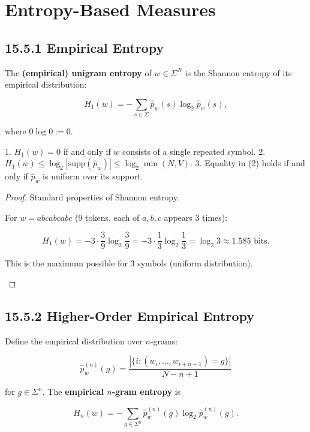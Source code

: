 \section{Entropy-Based Measures}

\subsection{15.5.1 Empirical Entropy}

\begin{definition}
The \textbf{(empirical) unigram entropy} of $w \in \Sigma^N$ is the Shannon entropy of its empirical distribution:

\[H_1(w) = -\sum_{s \in \Sigma} \hat{p}_w(s) \log_2 \hat{p}_w(s),\]

where $0 \log 0 := 0$.
\end{definition}

\begin{proposition}
1. $H_1(w) = 0$ if and only if $w$ consists of a single repeated symbol.
2. $H_1(w) \leq \log_2 |\mathrm{supp}(\hat{p}_w)| \leq \log_2 \min(N, V)$.
3. Equality in (2) holds if and only if $\hat{p}_w$ is uniform over its support.


\end{proposition}

\begin{proof}
Standard properties of Shannon entropy. 

\begin{example}
For $w = abcabcabc$ (9 tokens, each of $a, b, c$ appears 3 times):

\[H_1(w) = -3 \cdot \frac{3}{9} \log_2 \frac{3}{9} = -3 \cdot \frac{1}{3} \log_2 \frac{1}{3} = \log_2 3 \approx 1.585 \text{ bits}.\]

This is the maximum possible for 3 symbols (uniform distribution).
\end{example}

\end{proof}

\subsection{15.5.2 Higher-Order Empirical Entropy}

\begin{definition}
Define the empirical distribution over $n$-grams:

\[\hat{p}_w^{(n)}(g) = \frac{|\{i : (w_i, \ldots, w_{i+n-1}) = g\}|}{N - n + 1}\]

for $g \in \Sigma^n$. The \textbf{empirical $n$-gram entropy} is

\[H_n(w) = -\sum_{g \in \Sigma^n} \hat{p}_w^{(n)}(g) \log_2 \hat{p}_w^{(n)}(g).\]
\end{definition}

